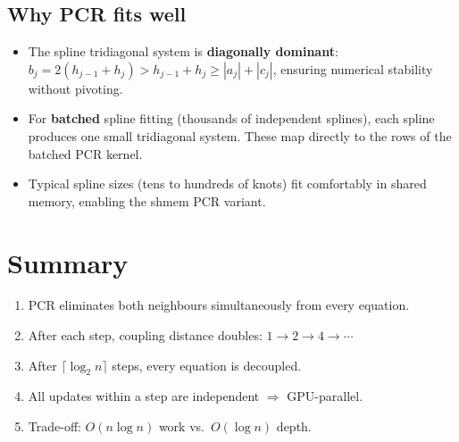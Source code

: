 \documentclass[11pt]{article}
\begin{document}
\subsection{Why PCR fits well}

\begin{itemize}
\item The spline tridiagonal system is \textbf{diagonally dominant}:
  $b_j = 2(h_{j-1} + h_j) > h_{j-1} + h_j \geq |a_j| + |c_j|$,
  ensuring numerical stability without pivoting.
\item For \textbf{batched} spline fitting (thousands of independent splines),
  each spline produces one small tridiagonal system. These map directly
  to the rows of the batched PCR kernel.
\item Typical spline sizes (tens to hundreds of knots) fit comfortably
  in shared memory, enabling the shmem PCR variant.
\end{itemize}

\section{Summary}

\begin{enumerate}
\item PCR eliminates both neighbours simultaneously from every equation.
\item After each step, coupling distance doubles: $1 \to 2 \to 4 \to \cdots$
\item After $\lceil \log_2 n \rceil$ steps, every equation is decoupled.
\item All updates within a step are independent $\Rightarrow$ GPU-parallel.
\item Trade-off: $O(n \log n)$ work vs.\ $O(\log n)$ depth.
\end{enumerate}
\end{document}
